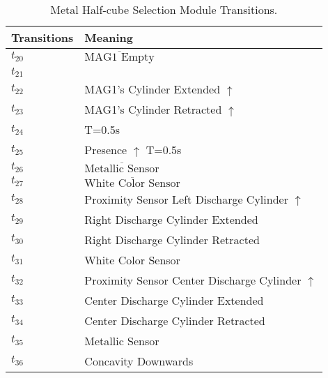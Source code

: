 \begin{table}[H]
\caption{Metal Half-cube Selection Module Transitions.}
\centering
\begin{tabular}{M{5cm}M{10cm}}
Transitions & Meaning\\
\hline
\hyperlink{partialNet:t20}{\hypertarget{partialTable:t20}{$t_{20}$}} & \(\overline{\mbox{MAG1 Empty}}\)\\
\hyperlink{partialNet:t21}{\hypertarget{partialTable:t21}{$t_{21}$}} & \\
\hyperlink{partialNet:t22}{\hypertarget{partialTable:t22}{$t_{22}$}} & MAG1's Cylinder Extended \(\uparrow\)\\
\hyperlink{partialNet:t23}{\hypertarget{partialTable:t23}{$t_{23}$}} & MAG1's Cylinder Retracted \(\uparrow\)\\
\hyperlink{partialNet:tt24}{\hypertarget{partialTable:tt24}{$t_{24}$}} & T=0.5s\\
\hyperlink{partialNet:tt25}{\hypertarget{partialTable:tt25}{$t_{25}$}} & Presence \(\uparrow\) T=0.5s\\
\hyperlink{partialNet:t26}{\hypertarget{partialTable:t26}{$t_{26}$}} & \(\overline{\mbox{Metallic Sensor}}\)\\
\hyperlink{partialNet:t27}{\hypertarget{partialTable:t27}{$t_{27}$}} & \(\overline{\mbox{White Color Sensor}}\)\\
\hyperlink{partialNet:t28}{\hypertarget{partialTable:t28}{$t_{28}$}} & Proximity Sensor Left Discharge Cylinder \(\uparrow\)\\
\hyperlink{partialNet:t29}{\hypertarget{partialTable:t29}{$t_{29}$}} & Right Discharge Cylinder Extended\\
\hyperlink{partialNet:t30}{\hypertarget{partialTable:t30}{$t_{30}$}} & Right Discharge Cylinder Retracted\\
\hyperlink{partialNet:t31}{\hypertarget{partialTable:t31}{$t_{31}$}} & White Color Sensor\\
\hyperlink{partialNet:t32}{\hypertarget{partialTable:t32}{$t_{32}$}} & Proximity Sensor Center Discharge Cylinder \(\uparrow\)\\
\hyperlink{partialNet:t33}{\hypertarget{partialTable:t33}{$t_{33}$}} & Center Discharge Cylinder Extended\\
\hyperlink{partialNet:t34}{\hypertarget{partialTable:t34}{$t_{34}$}} & Center Discharge Cylinder Retracted\\
\hyperlink{partialNet:t35}{\hypertarget{partialTable:t35}{$t_{35}$}} & Metallic Sensor\\
\hyperlink{partialNet:t36}{\hypertarget{partialTable:t36}{$t_{36}$}} & Concavity Downwards\\

\end{tabular}
\end{table}
